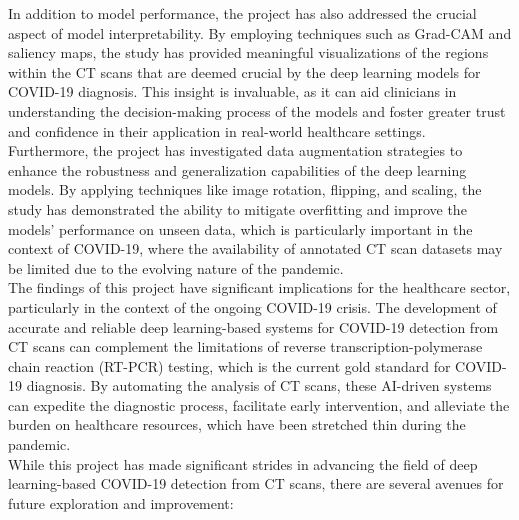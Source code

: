 \documentclass[12pt, a4paper]{report}
\begin{document}
In addition to model performance, the project has also addressed the crucial aspect of model interpretability. By employing techniques such as Grad-CAM and saliency maps, the study has provided meaningful visualizations of the regions within the CT scans that are deemed crucial by the deep learning models for COVID-19 diagnosis. This insight is invaluable, as it can aid clinicians in understanding the decision-making process of the models and foster greater trust and confidence in their application in real-world healthcare settings.\\

Furthermore, the project has investigated data augmentation strategies to enhance the robustness and generalization capabilities of the deep learning models. By applying techniques like image rotation, flipping, and scaling, the study has demonstrated the ability to  mitigate overfitting and improve the models' performance on unseen data, which is particularly important in the context of COVID-19, where the availability of annotated CT scan datasets may be limited due to the evolving nature of the pandemic.\\

The findings of this project have significant implications for the healthcare sector, particularly in the context of the ongoing COVID-19 crisis. The development of accurate and reliable deep learning-based systems for COVID-19 detection from CT scans can complement the limitations of reverse transcription-polymerase chain reaction (RT-PCR) testing, which is the current gold standard for COVID-19 diagnosis. By automating the analysis of CT scans, these AI-driven systems can expedite the diagnostic process, facilitate early intervention, and alleviate the burden on healthcare resources, which have been stretched thin during the pandemic.\\

While this project has made significant strides in advancing the field of deep learning-based COVID-19 detection from CT scans, there are several avenues for future exploration and improvement:
\end{document}
